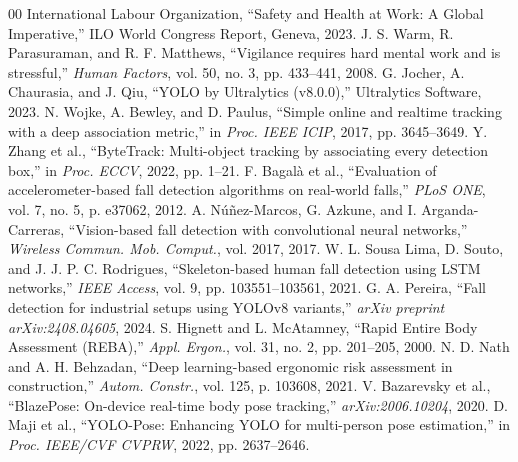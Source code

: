 \documentclass[conference]{IEEEtran}
\begin{document}
\begin{thebibliography}{00}
 International Labour Organization, ``Safety and Health at Work: A Global Imperative,'' ILO World Congress Report, Geneva, 2023.
 J. S. Warm, R. Parasuraman, and R. F. Matthews, ``Vigilance requires hard mental work and is stressful,'' \textit{Human Factors}, vol. 50, no. 3, pp. 433--441, 2008.
 G. Jocher, A. Chaurasia, and J. Qiu, ``YOLO by Ultralytics (v8.0.0),'' Ultralytics Software, 2023.
 N. Wojke, A. Bewley, and D. Paulus, ``Simple online and realtime tracking with a deep association metric,'' in \textit{Proc. IEEE ICIP}, 2017, pp. 3645--3649.
 Y. Zhang et al., ``ByteTrack: Multi-object tracking by associating every detection box,'' in \textit{Proc. ECCV}, 2022, pp. 1--21.
 F. Bagalà et al., ``Evaluation of accelerometer-based fall detection algorithms on real-world falls,'' \textit{PLoS ONE}, vol. 7, no. 5, p. e37062, 2012.
 A. Núñez-Marcos, G. Azkune, and I. Arganda-Carreras, ``Vision-based fall detection with convolutional neural networks,'' \textit{Wireless Commun. Mob. Comput.}, vol. 2017, 2017.
 W. L. Sousa Lima, D. Souto, and J. J. P. C. Rodrigues, ``Skeleton-based human fall detection using LSTM networks,'' \textit{IEEE Access}, vol. 9, pp. 103551--103561, 2021.
 G. A. Pereira, ``Fall detection for industrial setups using YOLOv8 variants,'' \textit{arXiv preprint arXiv:2408.04605}, 2024.
 S. Hignett and L. McAtamney, ``Rapid Entire Body Assessment (REBA),'' \textit{Appl. Ergon.}, vol. 31, no. 2, pp. 201--205, 2000.
 N. D. Nath and A. H. Behzadan, ``Deep learning-based ergonomic risk assessment in construction,'' \textit{Autom. Constr.}, vol. 125, p. 103608, 2021.
 V. Bazarevsky et al., ``BlazePose: On-device real-time body pose tracking,'' \textit{arXiv:2006.10204}, 2020.
 D. Maji et al., ``YOLO-Pose: Enhancing YOLO for multi-person pose estimation,'' in \textit{Proc. IEEE/CVF CVPRW}, 2022, pp. 2637--2646.
\end{thebibliography}
\end{document}
